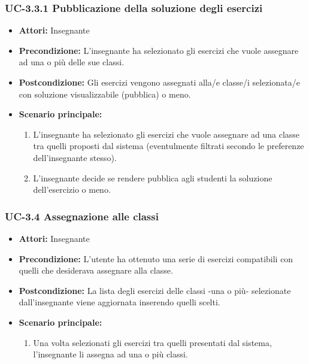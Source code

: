 \subsubsection{UC-3.3.1 Pubblicazione della soluzione degli esercizi}
\begin{itemize}
	\item \textbf{Attori:} Insegnante
	\item \textbf{Precondizione:} L'insegnante ha selezionato gli esercizi che vuole assegnare ad una o più delle sue classi.
	\item \textbf{Postcondizione:} Gli esercizi vengono assegnati alla/e classe/i selezionata/e con soluzione visualizzabile (pubblica) o meno.
	\item \textbf{Scenario principale:} 
	\begin{enumerate}
		\item L'insegnante ha selezionato gli esercizi che vuole assegnare ad una classe tra quelli proposti dal sistema (eventulmente filtrati secondo le preferenze dell'insegnante stesso).
		\item L'insegnante decide se rendere pubblica agli studenti la soluzione dell'esercizio o meno.
	\end{enumerate}
\end{itemize}

\subsubsection{UC-3.4 Assegnazione alle classi}
\begin{itemize}
		\item \textbf{Attori: }Insegnante
		\item \textbf{Precondizione: }L'utente ha ottenuto una serie di esercizi compatibili con quelli che desiderava assegnare alla classe.
		\item \textbf{Postcondizione: }La lista degli esercizi delle classi -una o più- selezionate dall'insegnante viene aggiornata inserendo quelli scelti.
		\item \textbf{Scenario principale: }
		\begin{enumerate}
			\item Una volta selezionati gli esercizi tra quelli presentati dal sistema, l'insegnante li assegna ad una o più classi.
		\end{enumerate} 
\end{itemize}
